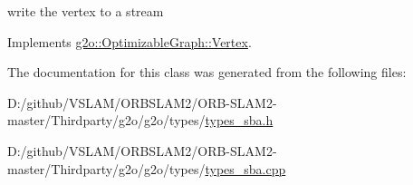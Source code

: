 write the vertex to a stream 



Implements \mbox{\hyperlink{classg2o_1_1_optimizable_graph_1_1_vertex_a4cac277db656fddb5f844d9009d601eb}{g2o\+::\+Optimizable\+Graph\+::\+Vertex}}.



The documentation for this class was generated from the following files\+:\begin{DoxyCompactItemize}
\item 
D\+:/github/\+V\+S\+L\+A\+M/\+O\+R\+B\+S\+L\+A\+M2/\+O\+R\+B-\/\+S\+L\+A\+M2-\/master/\+Thirdparty/g2o/g2o/types/\mbox{\hyperlink{types__sba_8h}{types\+\_\+sba.\+h}}\item 
D\+:/github/\+V\+S\+L\+A\+M/\+O\+R\+B\+S\+L\+A\+M2/\+O\+R\+B-\/\+S\+L\+A\+M2-\/master/\+Thirdparty/g2o/g2o/types/\mbox{\hyperlink{types__sba_8cpp}{types\+\_\+sba.\+cpp}}\end{DoxyCompactItemize}
